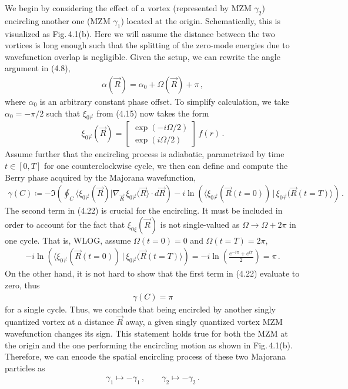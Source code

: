 \documentclass[11pt, oneside]{book}
\theoremstyle{break}
\theoremstyle{break}
\newcommand{\bmat}[1]{\begin{bmatrix} #1 \end{bmatrix}}
\begin{document}
We begin by considering the effect of a vortex (represented by MZM $\gamma_2$) encircling another one (MZM $\gamma_1$) located at the origin. Schematically, this is visualized as Fig.\,4.1(b). Here we will assume the distance between the two vortices is long enough such that the splitting of the zero-mode energies due to wavefunction overlap is negligible. Given the setup, we can rewrite the angle argument in (4.8), 
\begin{align}
\alpha(\vec{R}) = \alpha_0 + \Omega(\vec{R}) + \pi\,,
\end{align}
where $\alpha_0$ is an arbitrary constant phase offset. To simplify calculation, we take $\alpha_0 = -\pi/2$ such that $\xi_{0\vec{r}}$ from (4.15) now takes the form
\begin{align}
\xi_{0\vec{r}}(\vec{R}) = \bmat{\exp(-i\Omega/2)\\
\exp(i\Omega/2)
}\, f(r)\,.
\end{align}
Assume further that the encircling process is adiabatic, parametrized by time $t \in [0,T]$ for one counterclockwise cycle, we then can define and compute the Berry phase acquired by the Majorana wavefunction, 
\begin{align}
\gamma(C) \coloneqq - \Im\left( 
\oint_C \langle \xi_{0{\vec{r}}}(\vec{R})|\nabla_{\vec{R}} \, \xi_{0\vec{r}}(\vec{R}\rangle \cdot d\vec{R}\right) - i \ln 
\left(
\langle \xi_{0\vec{r}}(\vec{R}(t=0)) \, |\,\xi_{0\vec{r}}(\vec{R}(t=T)\rangle 
\right)
\,.
\end{align}
The second term in (4.22) is crucial for the encircling. It must be included in order to account for the fact that $\xi_{0\xi}(\vec{R})$ is not single-valued as $\Omega \to \Omega +2\pi$ in one cycle. That is, WLOG, assume $\Omega(t=0) = 0$ and $\Omega(t=T) = 2\pi$,
\begin{align}
-i \ln 
\left(
\langle \xi_{0\vec{r}}(\vec{R}(t=0)) \, |\,\xi_{0\vec{r}}(\vec{R}(t=T)\rangle 
\right) =- i\ln \left(\frac{
e^{-i\pi} + e^{i\pi}}{2}
\right) = \pi\,.
\end{align}
On the other hand, it is not hard to show that the first term in (4.22) evaluate to zero, thus 
\begin{align}
\gamma(C) = \pi
\end{align}
for a single cycle. Thus, we conclude that being encircled by another singly quantized vortex at a distance $\vec{R}$ away, a given singly quantized vortex MZM wavefunction changes its sign. This statement holds true for both the MZM at the origin and the one performing the encircling motion as shown in Fig.\,4.1(b). Therefore, we can encode the spatial encircling process of these two Majorana particles as
\begin{align}
\gamma_1 \mapsto - \gamma_1\,,\qquad
\gamma_2\mapsto -\gamma_2\,.
\end{align}
\end{document}
